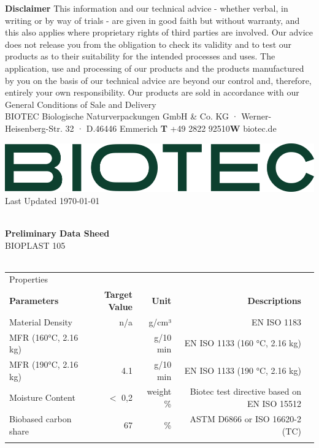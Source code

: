 \documentclass{article}
\begin{document}
\vspace*{\fill}
{\scriptsize
    \textbf{Disclaimer} This information and our technical advice - whether verbal, in writing or by way of trials - are given in good faith but without warranty, and this also applies where proprietary rights of third parties are involved. Our advice does not release you from the obligation to check its validity and to test our products as to their suitability for the intended processes and uses. The application, use and processing of our products and the products manufactured by you on the basis of our technical advice are beyond our control and, therefore, entirely your own responsibility. Our products are sold in accordance with our General Conditions of Sale and Delivery \\ 
 BIOTEC Biologische Naturverpackungen GmbH \& Co. KG · Werner-Heisenberg-Str. 32 · D.46446 Emmerich \hfill \textbf{T} +49 2822 92510\qquad \textbf{W} biotec.de}
\clearpage
\begin{flushleft}
\includegraphics[scale=0.20]{biotec}
\hfill\tiny Last Updated \today
\end{flushleft}
\begin{flushleft}
\hspace{1cm}\\
\textbf{Preliminary Data Sheed}\\
BIOPLAST 105\\
\hspace{1cm}\\
\end{flushleft}
\begin{center}
\begin{tabularx}
{\textwidth}{X r  r  r  r }\rowcolor{color_title}Properties &  &  &  &  \\
\textbf{Parameters} & \textbf{Target Value} & \textbf{Unit} & \textbf{Descriptions} &  \\
Material Density  & n/a & g/cm³ & EN ISO 1183 &  \\
\arrayrulecolor{line_color}\hline
MFR (160°C, 2.16 kg) &   & g/10 min & EN ISO 1133 (160 °C, 2.16 kg) &  \\
\arrayrulecolor{line_color}\hline
MFR (190°C, 2.16 kg) & 4.1 & g/10 min & EN ISO 1133 (190 °C, 2.16 kg) &  \\
\arrayrulecolor{line_color}\hline
Moisture Content & \(<\) 0,2 & weight \% & Biotec test directive based on EN ISO 15512 &  \\
\arrayrulecolor{line_color}\hline
Biobased carbon share & 67 & \% & ASTM D6866 or ISO 16620-2 (TC) &  \\
\arrayrulecolor{line_color}\hline

\end{tabularx}
\end{center}
\end{document}
